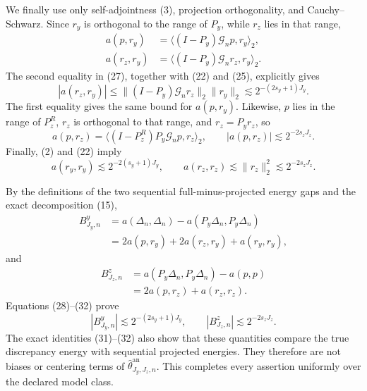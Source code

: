 We finally use only self-adjointness (3), projection orthogonality, and Cauchy--Schwarz.  Since \(r_y\) is orthogonal to the range of \(P_y\), while \(r_z\) lies in that range,
\[
 \begin{split}
 a(p,r_y)&=\langle(I-P_y)\mathcal G_np,r_y\rangle_2,\\
 a(r_z,r_y)&=\langle(I-P_y)\mathcal G_nr_z,r_y\rangle_2.
 \end{split} \tag{27}
\]
The second equality in (27), together with (22) and (25), explicitly gives
\[
 |a(r_z,r_y)|
 \leq\|(I-P_y)\mathcal G_nr_z\|_2\|r_y\|_2
 \lesssim2^{-(2s_y+1)J_y}. \tag{28}
\]
The first equality gives the same bound for \(a(p,r_y)\).  Likewise, \(p\) lies in the range of \(P_z^R\), \(r_z\) is orthogonal to that range, and \(r_z=P_yr_z\), so
\[
 a(p,r_z)=\langle(I-P_z^R)P_y\mathcal G_np,r_z\rangle_2,
 \qquad |a(p,r_z)|\lesssim2^{-2s_zJ_z}. \tag{29}
\]
Finally, (2) and (22) imply
\[
 a(r_y,r_y)\lesssim2^{-2(s_y+1)J_y},
 \qquad a(r_z,r_z)\lesssim\|r_z\|_2^2\lesssim2^{-2s_zJ_z}. \tag{30}
\]

By the definitions of the two sequential full-minus-projected energy gaps and the exact decomposition (15),
\[
 \begin{aligned}
 B^y_{J_y,n}
 &=a(\Delta_n,\Delta_n)-a(P_y\Delta_n,P_y\Delta_n)\\
 &=2a(p,r_y)+2a(r_z,r_y)+a(r_y,r_y),
 \end{aligned} \tag{31}
\]
and
\[
 \begin{aligned}
 B^z_{J_z,n}
 &=a(P_y\Delta_n,P_y\Delta_n)-a(p,p)\\
 &=2a(p,r_z)+a(r_z,r_z).
 \end{aligned} \tag{32}
\]
Equations (28)--(32) prove
\[
 |B^y_{J_y,n}|\lesssim2^{-(2s_y+1)J_y},
 \qquad |B^z_{J_z,n}|\lesssim2^{-2s_zJ_z}. \tag{33}
\]
The exact identities (31)--(32) also show that these quantities compare the true discrepancy energy with sequential projected energies.  They therefore are not biases or centering terms of \(\widehat\theta^{\mathrm{an}}_{J_y,J_z,n}\).  This completes every assertion uniformly over the declared model class.
